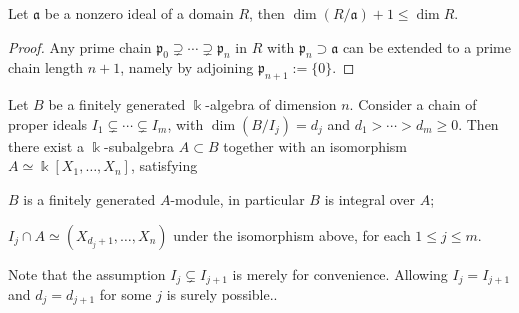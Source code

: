 \begin{lemma}\label{prop:normalization-aux}
	Let $\mathfrak{a}$ be a nonzero ideal of a domain $R$, then $\dim(R/\mathfrak{a}) + 1 \leq \dim R$.
\end{lemma}
\begin{proof}
	Any prime chain $\mathfrak{p}_0 \supsetneq \cdots \supsetneq \mathfrak{p}_n$ in $R$ with $\mathfrak{p}_n \supset \mathfrak{a}$ can be extended to a prime chain length $n+1$, namely by adjoining $\mathfrak{p}_{n+1} := \{0\}$.
\end{proof}

\begin{theorem}\label{prop:Noether-normalization}
	Let $B$ be a finitely generated $\Bbbk$-algebra of dimension $n$. Consider a chain of proper ideals $I_1 \subsetneq \cdots \subsetneq I_m$, with $\dim(B/I_j) = d_j$ and $d_1 > \cdots > d_m \geq 0$. Then there exist a $\Bbbk$-subalgebra $A \subset B$ together with an isomorphism $A \simeq \Bbbk[X_1, \ldots, X_n]$, satisfying
	\begin{compactitem}
		\item $B$ is a finitely generated $A$-module, in particular $B$ is integral over $A$;
		\item $I_j \cap A \simeq (X_{d_j+1}, \ldots, X_n)$ under the isomorphism above, for each $1 \leq j \leq m$.
	\end{compactitem}
\end{theorem}

Note that the assumption $I_j \subsetneq I_{j+1}$ is merely for convenience. Allowing $I_j = I_{j+1}$ and $d_j = d_{j+1}$ for some $j$ is surely possible..

